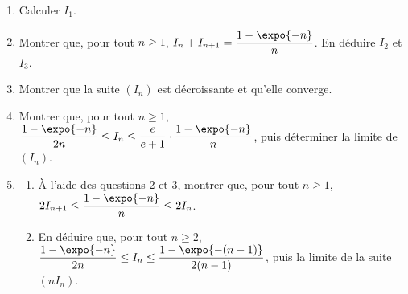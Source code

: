 \begin{exo}
\begin{description}
                  \begin{enumerate}
                        \item Calculer $I_1$.
                        \item Montrer que, pour tout $n \geq 1$, $I_n + I_{n+1} = \dfrac{1 - \expo{-n}}{n}$.
                              En d\'eduire $I_2$ et $I_3$.
                        \item Montrer que la suite $(I_n)$ est d\'ecroissante et qu'elle converge.
                        \item Montrer que, pour tout $n \geq 1$,
                              $\dfrac{1 - \expo{-n}}{2n} \leq I_n \leq \dfrac{e}{e+1} \cdot \dfrac{1 - \expo{-n}}{n}$,
                              puis d\'eterminer la limite de $(I_n)$.
                        \item \begin{enumerate}
                                    \item \`A l'aide des questions 2 et 3, montrer que, pour tout $n \geq 1$,
                                          $2 I_{n+1} \leq \dfrac{1 - \expo{-n}}{n} \leq 2 I_n$.
                                    \item En d\'eduire que, pour tout $n \geq 2$,
                                          $\dfrac{1 - \expo{-n}}{2n} \leq I_n \leq \dfrac{1 - \expo{-(n-1)}}{2(n-1)}$,
                                          puis la limite de la suite $(n I_n)$.
                              \end{enumerate}
                  \end{enumerate}
      \end{description}
\end{exo}
